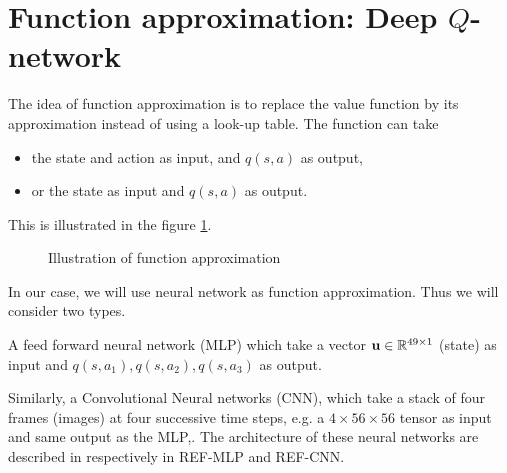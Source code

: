 \section{Function approximation: Deep $Q$-network}
The idea of function approximation is to replace the value function by its approximation instead of using a look-up table. The function can take
\begin{itemize}
	\item the state and action as input, and $q(s,a)$ as output,
	\item or the state as input and $q(s,a)$ as output.
\end{itemize}
This is illustrated in the figure \ref{fig:fct-approx}.
\begin{figure}
	\centering
{}
\caption{Illustration of function approximation}
\label{fig:fct-approx}
\end{figure}


In our case, we will use neural network as function approximation. Thus we will consider two types.

A feed forward neural network (MLP) which take a vector $\mathbf{u}\in\mathbb{R}^{49\times1}$ (state) as input and $q(s,a_1), q(s,a_2),q(s,a_3)$ as output.

Similarly, a Convolutional Neural networks (CNN), which take a stack of four frames (images) at four successive time steps, e.g. a $4\times56\times56$ tensor as input and same output as the MLP,. The architecture of these neural networks are described in respectively in REF-MLP and REF-CNN.


